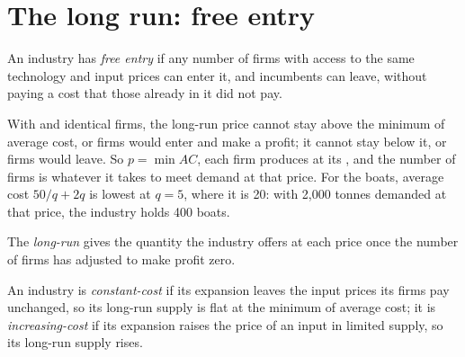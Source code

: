\section{The long run: free entry}\label{sec:b1:competitive-industry:long-run}

\begin{definition}\label{def:b1:competitive-industry:free-entry}
An industry has \emph{free entry} if any number of firms with access to the
same technology and input prices can enter it, and incumbents can leave,
without paying a cost that those already in it did not pay.
\end{definition}

With  and identical firms, the long-run price cannot stay above
the minimum of average cost, or firms would enter and make a profit; it
cannot stay below it, or firms would leave. So $p = \min AC$, each firm
produces at its , and the number of firms is
whatever it takes to meet demand at that price. For the boats, average
cost $50/q + 2q$ is lowest at $q = 5$, where it is 20: with 2,000 tonnes
demanded at that price, the industry holds 400 boats.

\begin{definition}\label{def:b1:competitive-industry:lr-supply}
The \emph{long-run } gives the quantity the industry
offers at each price once the number of firms has adjusted to make profit
zero.
\end{definition}

\begin{definition}\label{def:b1:competitive-industry:cost-industry}
An industry is \emph{constant-cost} if its expansion leaves the input prices
its firms pay unchanged, so its long-run supply is flat at the minimum of
average cost; it is \emph{increasing-cost} if its expansion raises the price
of an input in limited supply, so its long-run supply rises.
\end{definition}

